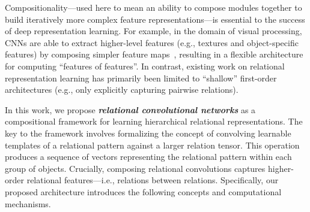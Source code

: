 Compositionality---used here to mean an ability to compose modules together to build iteratively more complex feature representations---is essential to the success of deep representation learning. 
For example, in the domain of visual processing, CNNs are able to extract higher-level features (e.g., textures and object-specific features) by composing simpler feature maps~\citep{zeiler2014visualizing}, resulting in a flexible architecture for computing ``features of features''.
In contrast, existing work on relational representation learning has primarily been limited to ``shallow'' first-order architectures (e.g., only explicitly capturing pairwise relations).

In this work, we propose \textit{\bfseries relational convolutional networks} as a compositional framework for learning hierarchical relational representations. The key to the framework involves formalizing the concept of convolving learnable templates of a relational pattern against a larger relation tensor. This operation produces a sequence of vectors representing the relational pattern within each group of objects. Crucially, composing relational convolutions captures higher-order relational features---i.e., relations between relations. Specifically, our proposed architecture introduces the following concepts and computational mechanisms.

